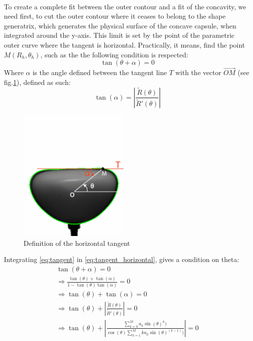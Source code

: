 \paragraph{}
To create a complete fit between the outer contour and a fit of the concavity, we need first, to cut the outer contour where it ceases to belong to the shape generatrix, which generates the physical surface of the concave capsule, when integrated around the y-axis. This limit is set by the point of the parametric outer curve where the tangent is horizontal.
Practically, it means, find the point $M(R_{h},\theta_h)$, such as the the following condition is respected:
\begin{equation}
	\tan(\theta+\alpha) =0
	\label{eq:tangent_horizontal}
\end{equation}
Where $\alpha$ is the angle defined between the tangent line $T$ with the vector $\vec{OM}$ (see fig.\ref{fig:Illustration_tangent}), defined as such:
\begin{equation}
	\tan(\alpha) =|{\frac {\tilde{R}(\theta )}{\tilde{R}'(\theta )}}|
	\label{eq:tangent}
\end{equation}
\begin{figure}[H] %
	\centering%
  \includegraphics[width=0.48\textwidth]{figures/Chapter_1/tan_alpha.png}
	\caption{Definition of the horizontal tangent}
	\label{fig:Illustration_tangent}
\end{figure}
Integrating \eqref{eq:tangent} in \eqref{eq:tangent_horizontal}, gives a condition on theta:
	\begin{gather*}
		\tan(\theta+\alpha) =0\\
		\Rightarrow\frac{\tan(\theta)+\tan(\alpha)}{1-\tan(\theta)\tan(\alpha)} = 0\\
		\Rightarrow\tan(\theta)+\tan(\alpha) = 0\\
		\Rightarrow\tan(\theta)+|{\frac {\tilde{R}(\theta )}{\tilde{R}'(\theta )}}|=0\\
		\Rightarrow\tan(\theta)+|{\frac {\sum\limits_{k=0}^M a_k \sin(\theta)^k  )}{\cos(\theta) \sum\limits_{k=1}^M k a_k \sin(\theta)^{(k-1)} )}}|=0
	\end{gather*}
